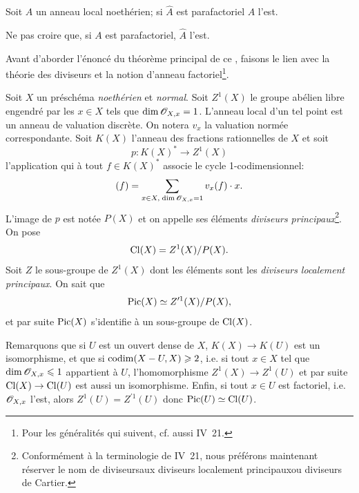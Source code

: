 \begin{corollaire} \label{XI.3.7} Soit $A$ un anneau local noeth\'erien; si $\hat A$ est parafactoriel $A$ l'est.
\end{corollaire}

Ne pas croire que, si $A$ est parafactoriel, $\hat A$ l'est.

\danger

Avant d'aborder l'\'enonc\'e du th\'eor\`eme principal de ce \no, faisons le lien avec la th\'eorie des diviseurs et la notion d'anneau factoriel\footnote{Pour les g\'en\'eralit\'es qui suivent, cf. aussi \EGA IV~21.}.

Soit $X$ un pr\'esch\'ema \emph{noethérien} et \emph{normal}. Soit $Z^1(X)$ le groupe ab\'elien libre engendr\'e par les $x\in X$ tels que $\dim\mathscr{O}_{X, x}=1$. L'anneau local d'un tel point est un anneau de valuation discr\`ete. On notera $v_x$ la valuation norm\'ee correspondante. Soit $K(X)$ l'anneau des fractions rationnelles de $X$ et soit
\[
p\colon K(X)^*\to Z^1(X)
\]
l'application qui \`a tout $f\in K(X)^*$ associe le cycle 1-codimensionnel:
\[
(f) = \sum_{x\in X, \;\dim\mathscr{O}_{X, x}=1} v_x(f)\cdot x{}.
\]
L'image de $p$ est not\'ee $P(X)$ et on appelle ses \'el\'ements \emph{diviseurs principaux}\footnote{Conform\'ement \`a la terminologie de \EGA IV~21, nous pr\'ef\'erons maintenant r\'eserver le nom de \og diviseurs\fg aux \og diviseurs localement principaux\fg ou \og diviseurs de Cartier\fg.}. On pose
\[
\operatorname{Cl}(X) = Z^1(X)/P(X){}.
\]
Soit $Z$ le sous-groupe de $Z^1(X)$ dont les \'el\'ements sont les \emph{diviseurs localement principaux}. On sait que
\[
\operatorname{Pic}(X)\simeq Z^{\prime1}(X)/P(X){},
\]
et par suite $\operatorname{Pic}(X)$ s'identifie \`a un sous-groupe de $\operatorname{Cl}(X)$.

Remarquons que si $U$ est un ouvert dense de $X$, $K(X)\to K(U)$ est un isomorphisme, et que si $\operatorname{codim}(X-U, X)\geqslant 2$, i.e. si tout $x\in X$ tel que $\dim\mathscr{O}_{X, x}\leqslant 1$ appartient \`a $U$, l'homomorphisme $Z^1(X)\to Z^1(U)$ et par suite $\Cl(X)\to\Cl(U)$ est aussi un isomorphisme. Enfin, si tout $x\in U$ est factoriel, i.e. $\mathscr{O}_{X, x}$ l'est, alors $Z^1(U) = Z^{\prime1}(U)$ donc $\operatorname{Pic}(U)\simeq\operatorname{Cl}(U)$.

